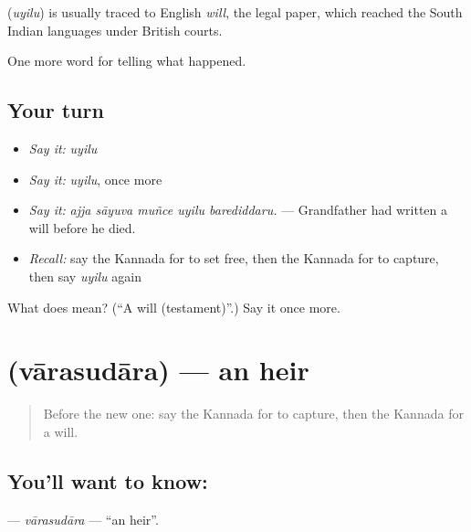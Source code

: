 \begin{cousinweb}
\textbf{} (\emph{uyilu}) is usually traced to English \emph{will}, the legal paper, which reached the South Indian languages under British courts.
\end{cousinweb}

\begin{grammarlens}[title={What you've built}]
One more word for telling what happened.
\end{grammarlens}

\subsection*{Your turn}
\begin{itemize}
\raggedright
  \item \emph{Say it:} \emph{uyilu}
  \item \emph{Say it:} \emph{uyilu}, once more
  \item \emph{Say it:} \emph{ajja sāyuva muñce uyilu barediddaru.} — Grandfather had written a will before he died.
  \item \emph{Recall:} say the Kannada for to set free, then the Kannada for to capture, then say \emph{uyilu} again
\end{itemize}

\begin{tcolorbox}[breakable,colback=teal!4,colframe=teal!35!black,title={Before you move on}]
What does  mean? (\textquotedblleft{}A will (testament)\textquotedblright{}.) Say it once more.
\end{tcolorbox}
\section[\texorpdfstring{\kn{ವಾರಸುದಾರ} (vārasudāra)}{ವಾರಸುದಾರ (vārasudāra)}]{ (vārasudāra) — an heir}

\label{lesson:KA-C353-varasudara}



\begin{quote}
Before the new one: say the Kannada for to capture, then the Kannada for a will.
\end{quote}

\subsection*{You'll want to know: }
\textbf{} — \emph{vārasudāra} — \textquotedblleft{}an heir\textquotedblright{}.

